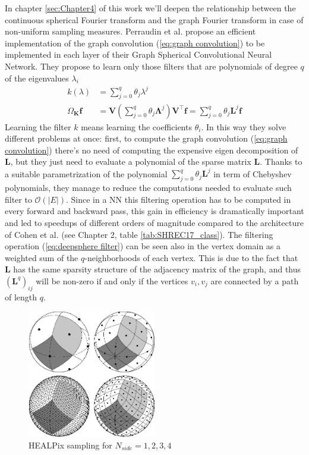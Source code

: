 In chapter \ref{sec:Chapter4} of this work we'll deepen the relationship between the continuous spherical Fourier transform and the graph Fourier transform in case of non-uniform sampling measures. Perraudin et al. propose an efficient implementation of the graph convolution (\ref{eq:graph convolution}) to be implemented in each layer of their Graph Spherical Convolutional Neural Network. They propose to learn only those filters that are polynomials of degree $q$ of the eigenvalues $\lambda_i$
\begin{equation}\label{eq:deepsphere filter}
\begin{aligned}
k(\lambda) &= \sum_{j=0}^{q} \theta_{j} \lambda^{j}\\ 
\Omega_\mathbf K \mathbf f &= \boldsymbol{V}\left(\sum_{j=0}^{q} \theta_{j} \boldsymbol{\Lambda}^{j}\right) \boldsymbol{V}^{\top} \boldsymbol{f}=\sum_{j=0}^{q} \theta_{j} \boldsymbol{L}^{j} \boldsymbol{f}
\end{aligned}
\end{equation}
Learning the filter $k$ means learning the coefficients $\theta_i$. In this way they solve different problems at once: first, to compute the graph convolution (\ref{eq:graph convolution}) there's no need of computing the expensive eigen decomposition of $\mathbf L$, but they just need to evaluate a polynomial of the sparse matrix $\mathbf L$. Thanks to a suitable parametrization of the polynomial $\sum_{j=0}^{q} \theta_{j} \boldsymbol{L}^{j}$ in term of Chebyshev polynomials, they manage to reduce the computations needed to evaluate such filter to $\mathcal O(|E|)$. Since in a NN this filtering operation has to be computed in every forward and backward pass, this gain in efficiency is dramatically important and led to speedups of different orders of magnitude compared to the architecture of Cohen et al. (see Chapter 2, table \ref{tab:SHREC17_class}). The filtering operation (\ref{eq:deepsphere filter}) can be seen also in the vertex domain as a weighted sum of the $q$-neighborhoods of each vertex. This is due to the fact that $\mathbf L $ has the same sparsity structure of the adjacency matrix of the graph, and thus $(\mathbf L^q)_{ij}$ will be non-zero if and only if the vertices $v_i, v_j$ are connected by a path of length $q$. 

\begin{figure}
	\centering
	\includegraphics[width=0.5\textwidth]{figs/chapter1/healpix.jpg}
	\caption{\label{fig:healpix sampling}HEALPix sampling for $N_{side}=1,2,3,4$ \cite{HEALPix}}
\end{figure}

